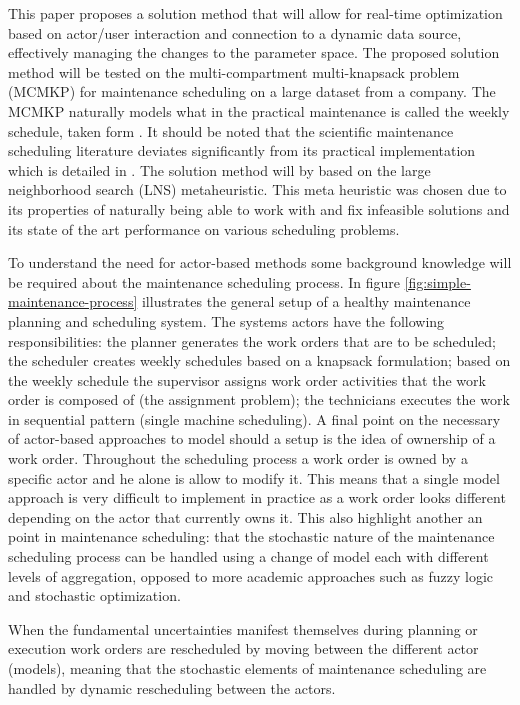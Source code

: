 \documentclass[preprint,12pt,authoryear]{elsarticle}
\begin{document}
This paper proposes a solution method that will allow for real-time optimization based on actor/user interaction and connection to a dynamic data source, effectively managing the changes to the parameter space. The proposed solution method will be tested on the multi-compartment multi-knapsack problem (MCMKP) for maintenance scheduling on a large dataset from a company. The MCMKP naturally models what in the practical maintenance is called the weekly schedule, taken form \citep{palmerMaintenancePlanningScheduling2019}. It should be noted that the scientific maintenance scheduling literature deviates significantly from its practical implementation which is detailed in \citep{palmerMaintenancePlanningScheduling2019}. The solution method will by based on the large neighborhood search (LNS) metaheuristic. This meta heuristic was chosen due to its properties of naturally being able to work with and fix infeasible solutions and its state of the art performance on various scheduling problems. 

To understand the need for actor-based methods some background knowledge will be required about the maintenance scheduling process. In figure \ref{fig:simple-maintenance-process} illustrates the general setup of a healthy maintenance planning and scheduling system. The systems actors have the following responsibilities: the planner generates the work orders that are to be scheduled; the scheduler creates weekly schedules based on a knapsack formulation; based on the weekly schedule the supervisor assigns work order activities that the work order is composed of (the assignment problem); the technicians executes the work in sequential pattern (single machine scheduling). A final point on the necessary of actor-based approaches to model should a setup is the idea of ownership of a work order. Throughout the scheduling process a work order is owned by a specific actor and he alone is allow to modify it. This means that a single model approach is very difficult to implement in practice as a work order looks different depending on the actor that currently owns it. This also highlight another an point in maintenance scheduling: that the stochastic nature of the maintenance scheduling process can be handled using a change of model each with different levels of aggregation, opposed to more academic approaches such as fuzzy logic and stochastic optimization.

When the fundamental uncertainties manifest themselves during planning or execution work orders are rescheduled by moving between the different actor (models), meaning that the stochastic elements of maintenance scheduling are handled by dynamic rescheduling between the actors.
\end{document}
